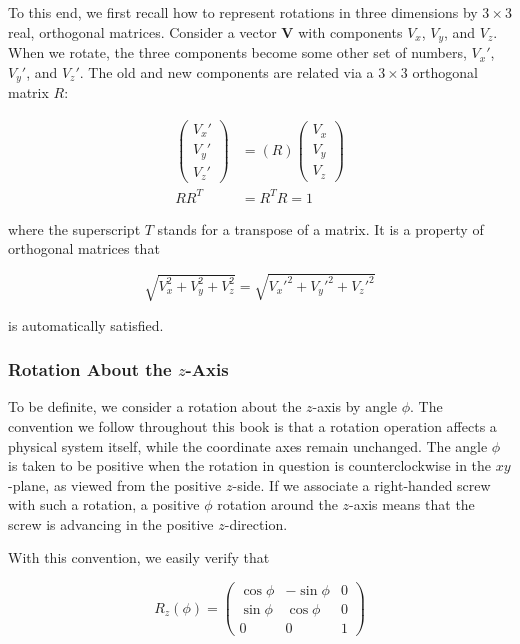 \documentclass[11pt,a4paper]{article}
\begin{document}
To this end, we first recall how to represent rotations in three dimensions by $3 \times 3$ real, orthogonal matrices. Consider a vector $\mathbf{V}$ with components $V_x$, $V_y$, and $V_z$. When we rotate, the three components become some other set of numbers, $V_x'$, $V_y'$, and $V_z'$. The old and new components are related via a $3 \times 3$ orthogonal matrix $R$:

\begin{align}
\begin{pmatrix} V_x' \\ V_y' \\ V_z' \end{pmatrix} &= (R)\begin{pmatrix} V_x \\ V_y \\ V_z \end{pmatrix} \tag{3.1a} \\
RR^T &= R^T R = 1 \tag{3.1b}
\end{align}

where the superscript $T$ stands for a transpose of a matrix. It is a property of orthogonal matrices that

\begin{equation}
\sqrt{V_x^2 + V_y^2 + V_z^2} = \sqrt{V_x'^2 + V_y'^2 + V_z'^2}
\tag{3.2}
\end{equation}

is automatically satisfied.

\subsubsection{Rotation About the $z$-Axis}

To be definite, we consider a rotation about the $z$-axis by angle $\phi$. The convention we follow throughout this book is that a rotation operation affects a physical system itself, while the coordinate axes remain unchanged. The angle $\phi$ is taken to be positive when the rotation in question is counterclockwise in the $xy$-plane, as viewed from the positive $z$-side. If we associate a right-handed screw with such a rotation, a positive $\phi$ rotation around the $z$-axis means that the screw is advancing in the positive $z$-direction.

With this convention, we easily verify that

\begin{equation}
\boxed{R_z(\phi) = \begin{pmatrix} \cos\phi & -\sin\phi & 0 \\ \sin\phi & \cos\phi & 0 \\ 0 & 0 & 1 \end{pmatrix}}
\tag{3.3}
\end{equation}
\end{document}
